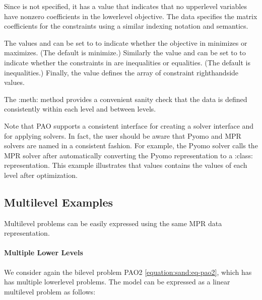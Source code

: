 \documentclass[letterpaper,10pt,english]{sphinxmanual}
\begin{document}
Since  is not specified, it has a value  that
indicates that no upper\sphinxhyphen{}level variables have non\sphinxhyphen{}zero coefficients in the
lower\sphinxhyphen{}level objective.  The  data specifies the matrix coefficients
for the constraints using a similar indexing notation and semantics.

The values  and  can be set to 
to indicate whether the objective in  minimizes or maximizes.
(The default is minimize.)  Similarly the value 
and  can be set to  to indicate whether the
constraints in  are inequalities or equalities.  (The default
is inequalities.)  Finally, the value  defines the array of
constraint right\sphinxhyphen{}hand\sphinxhyphen{}side values.

The :meth: method provides a convenient sanity check that the
data is defined consistently within each level and between levels.

Note that PAO supports a consistent interface for creating a solver
interface and for applying solvers.  In fact, the user should be
aware that Pyomo and MPR solvers are named in a consistent fashion.
For example, the Pyomo solver  calls the MPR solver
 after automatically converting the Pyomo representation
to a :class: representation.  This example
illustrates that values  contains the values of each level
 after optimization.


\subsection{Multilevel Examples}
\label{\detokenize{representations/mpr:multilevel-examples}}
Multilevel problems can be easily expressed using the same MPR data
representation.


\paragraph{Multiple Lower Levels}
\label{\detokenize{representations/mpr:multiple-lower-levels}}
We consider again the bilevel problem PAO2 \eqref{equation:sand:eq-pao2}, which has has
multiple lower\sphinxhyphen{}level problems.  The  model can be expressed as
a linear multilevel problem as follows:
\end{document}

